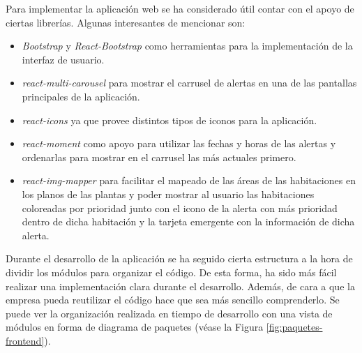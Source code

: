 Para implementar la aplicación web se ha considerado útil contar con el apoyo de ciertas librerías. Algunas interesantes de mencionar son:
\begin{itemize}
	\item \textit{Bootstrap} \cite{bootstrap} y \textit{React-Bootstrap} \cite{react-bootstrap} como herramientas para la implementación de la interfaz de usuario.
	\item \textit{react-multi-carousel} \cite{react-multi-carousel} para mostrar el carrusel de alertas en una de las pantallas principales de la aplicación.
	\item \textit{react-icons} \cite{react-icons} ya que provee distintos tipos de iconos para la aplicación.
	\item \textit{react-moment} \cite{react-moment} como apoyo para utilizar las fechas y horas de las alertas y ordenarlas para mostrar en el carrusel las más actuales primero.
	\item \textit{react-img-mapper} \cite{react-img-mapper} para facilitar el mapeado de las áreas de las habitaciones en los planos de las plantas y poder mostrar al usuario las habitaciones coloreadas por prioridad junto con el icono de la alerta con más prioridad dentro de dicha habitación y la tarjeta emergente con la información de dicha alerta.
\end{itemize}


Durante el desarrollo de la aplicación se ha seguido cierta estructura a la hora de dividir los módulos para organizar el código. De esta forma, ha sido más fácil realizar una implementación clara durante el desarrollo. Además, de cara a que la empresa pueda reutilizar el código hace que sea más sencillo comprenderlo. Se puede ver la organización realizada  en tiempo de desarrollo con una vista de módulos en forma de diagrama de paquetes (véase la Figura \ref{fig:paquetes-frontend}).\\

